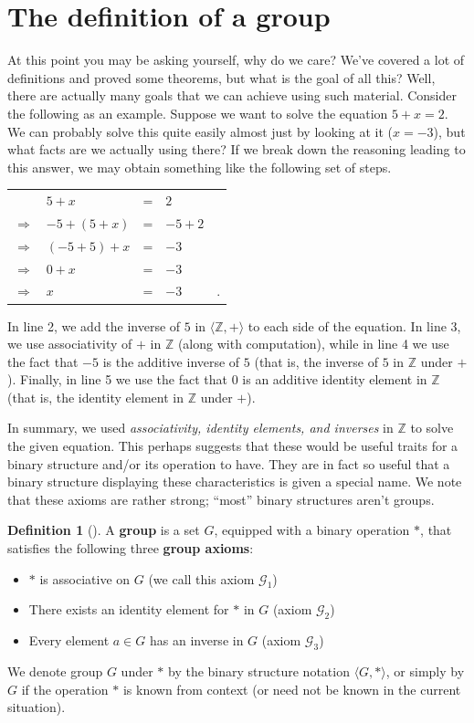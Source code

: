 \documentclass[10pt,]{book}
\newcommand{\terminology}[1]{\textbf{#1}}
\theoremstyle{plain}
\theoremstyle{definition}
\newtheorem{definition}[theorem]{Definition}
\theoremstyle{definition}
\theoremstyle{definition}
\theoremstyle{definition}
\numberwithin{equation}{section}
\def\Z{\mathbb{Z}}
\def\G{\mathcal{G}}
\begin{document}
\section[{The definition of a group}]{The definition of a group}\label{section-5}
At this point you may be asking yourself, why do we care? We've covered a lot of definitions and proved some theorems, but what is the goal of all this? Well, there are actually many goals that we can achieve using such material. Consider the following as an example. Suppose we want to solve the equation \(5+x=2\). We can probably solve this quite easily almost just by looking at it (\(x=-3\)), but what facts are we actually using there? If we break down the reasoning leading to this answer, we may obtain something like the following set of steps.%
\begin{tabular}{lllll}
&\(5+x\)&=&\(2\)&\tabularnewline[0pt]
\(\Rightarrow\)&\(-5+(5+x)\)&=&\(-5+2\)&\tabularnewline[0pt]
\(\Rightarrow\)&\((-5+5)+x\)&=&\(-3\)&\tabularnewline[0pt]
\(\Rightarrow\)&\(0+x\)&=&\(-3\)&\tabularnewline[0pt]
\(\Rightarrow\)&\(x\)&=&\(-3\)&.
\end{tabular}
In line 2, we add the inverse of \(5\) in \(\langle \Z, +\rangle\) to each side of the equation. In line 3, we use associativity of \(+\) in \(\Z\) (along with computation), while in line 4 we use the fact that \(-5\) is the additive inverse of \(5\) (that is, the inverse of \(5\) in \(\Z\) under \(+\)). Finally, in line 5 we use the fact that 0 is an additive identity element in \(\Z\) (that is, the identity element in \(\Z\) under \(+\)).%
\par
In summary, we used \emph{associativity, identity elements, and inverses} in \(\Z\) to solve the given equation. This perhaps suggests that these would be useful traits for a binary structure and/or its operation to have. They are in fact so useful that a binary structure displaying these characteristics is given a special name. We note that these axioms are rather strong; ``most'' binary structures aren't groups.%
\begin{definition}[{}]\label{definition-18}
A \terminology{group} is a set \(G\), equipped with a binary operation \(*\), that satisfies the following three \terminology{group axioms}: \leavevmode%
\begin{itemize}[label=\textbullet]
\item{}\(*\) is associative on \(G\) (we call this axiom \(\G_1\))%
\item{}There exists an identity element for \(*\) in \(G\) (axiom \(\G_2\))%
\item{}Every element \(a\in G\) has an inverse in \(G\) (axiom \(\G_3\))%
\end{itemize}
%
\par
We denote group \(G\) under \(*\) by the binary structure notation \(\langle G,*\rangle\), or simply by \(G\) if the operation \(*\) is known from context (or need not be known in the current situation).%
\end{definition}
\end{document}
